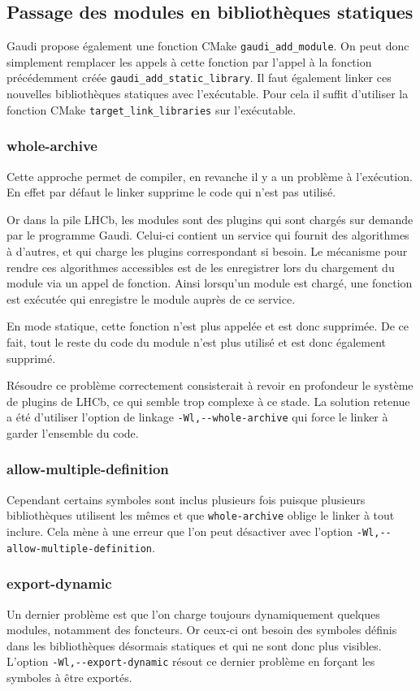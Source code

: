 \documentclass[a4paper,11pt]{report}
\begin{document}
\subsection{Passage des modules en bibliothèques statiques}
Gaudi propose également une fonction CMake \verb'gaudi_add_module'.
On peut donc simplement remplacer les appels à cette fonction par l'appel à la fonction précédemment créée \verb'gaudi_add_static_library'.
Il faut également linker ces nouvelles bibliothèques statiques avec l'exécutable.
Pour cela il suffit d'utiliser la fonction CMake \verb'target_link_libraries' sur l'exécutable.

\subsubsection{whole-archive}
Cette approche permet de compiler, en revanche il y a un problème à l'exécution.
En effet par défaut le linker supprime le code qui n'est pas utilisé.

Or dans la pile LHCb, les modules sont des plugins qui sont chargés sur demande par le programme Gaudi.
Celui-ci contient un service qui fournit des algorithmes à d'autres, et qui charge les plugins correspondant si besoin.
Le mécanisme pour rendre ces algorithmes accessibles est de les enregistrer lors du chargement du module via un appel de fonction.
Ainsi lorsqu'un module est chargé, une fonction est exécutée qui enregistre le module auprès de ce service.

En mode statique, cette fonction n'est plus appelée et est donc supprimée.
De ce fait, tout le reste du code du module n'est plus utilisé et est donc également supprimé.

Résoudre ce problème correctement consisterait à revoir en profondeur le système de plugins de LHCb, ce qui semble trop complexe à ce stade.
La solution retenue a été d'utiliser l'option de linkage \verb'-Wl,--whole-archive' qui force le linker à garder l'ensemble du code.

\subsubsection{allow-multiple-definition}
Cependant certains symboles sont inclus plusieurs fois puisque plusieurs bibliothèques utilisent les mêmes et que \verb'whole-archive' oblige le linker à tout inclure.
Cela mène à une erreur que l'on peut désactiver avec l'option \verb'-Wl,--allow-multiple-definition'.

\subsubsection{export-dynamic}
Un dernier problème est que l'on charge toujours dynamiquement quelques modules, notamment des foncteurs.
Or ceux-ci ont besoin des symboles définis dans les bibliothèques désormais statiques et qui ne sont donc plus visibles.
L'option \verb'-Wl,--export-dynamic' résout ce dernier problème en forçant les symboles à être exportés.
\end{document}

